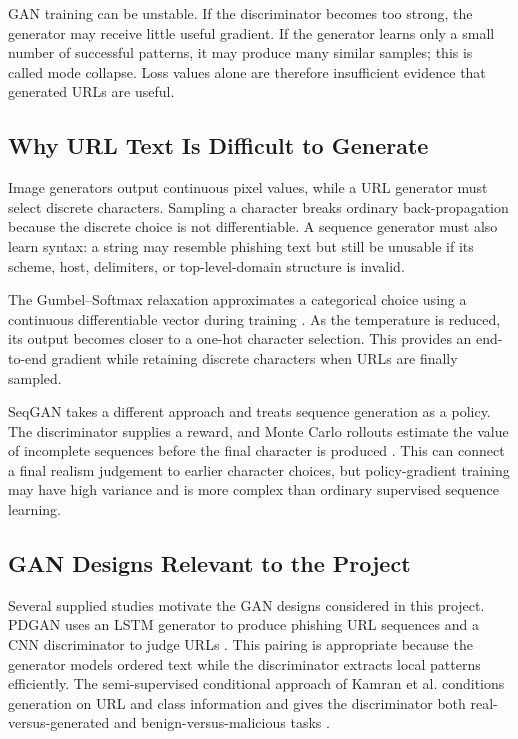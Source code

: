 GAN training can be unstable. If the discriminator becomes too strong, the
generator may receive little useful gradient. If the generator learns only a
small number of successful patterns, it may produce many similar samples; this
is called mode collapse. Loss values alone are therefore insufficient evidence
that generated URLs are useful.

\subsection{Why URL Text Is Difficult to Generate}

Image generators output continuous pixel values, while a URL generator must
select discrete characters. Sampling a character breaks ordinary
back-propagation because the discrete choice is not differentiable. A sequence
generator must also learn syntax: a string may resemble phishing text but still
be unusable if its scheme, host, delimiters, or top-level-domain structure is
invalid.

The Gumbel--Softmax relaxation approximates a categorical choice using a
continuous differentiable vector during training \citep{jang2017gumbel}. As the
temperature is reduced, its output becomes closer to a one-hot character
selection. This provides an end-to-end gradient while retaining discrete
characters when URLs are finally sampled.

SeqGAN takes a different approach and treats sequence generation as a policy.
The discriminator supplies a reward, and Monte Carlo rollouts estimate the
value of incomplete sequences before the final character is produced
\citep{yu2017seqgan}. This can connect a final realism judgement to earlier
character choices, but policy-gradient training may have high variance and is
more complex than ordinary supervised sequence learning.

\subsection{GAN Designs Relevant to the Project}

Several supplied studies motivate the GAN designs considered in this project.
PDGAN uses an LSTM generator to produce phishing URL sequences and a CNN
discriminator to judge URLs \citep{alahmadi2022pdgan}. This pairing is
appropriate because the generator models ordered text while the discriminator
extracts local patterns efficiently. The semi-supervised conditional approach
of Kamran et al. conditions generation on URL and class information and gives
the discriminator both real-versus-generated and benign-versus-malicious tasks
\citep{kamran2022conditional}.

